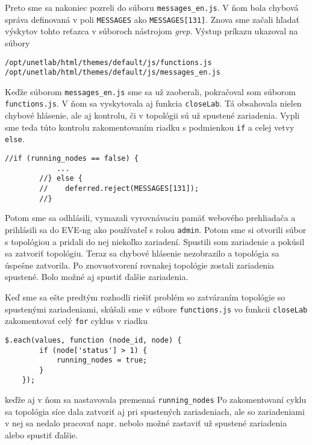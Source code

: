 Preto sme sa nakoniec pozreli do súboru \texttt{messages\_en.js}. V ňom bola chybová správa definovaná v poli \texttt{MESSAGES} ako \texttt{MESSAGES[131]}. Znova sme začali hľadať výskytov tohto reťazca v súboroch nástrojom \emph{grep}. Výstup príkazu ukazoval na súbory

\begin{Verbatim}[samepage=true]
/opt/unetlab/html/themes/default/js/functions.js
/opt/unetlab/html/themes/default/js/messages_en.js
\end{Verbatim}

Keďže súborom \texttt{messages\_en.js} sme sa už zaoberali, pokračoval som súborom \texttt{functions.js}. V ňom sa vyskytovala aj funkcia \texttt{closeLab}. Tá obsahovala nielen chybové hlásenie, ale aj kontrolu, či v topológii sú už spustené zariadenia. Vypli sme teda túto kontrolu zakomentovaním riadku s podmienkou \texttt{if} a celej vetvy \texttt{else}.

\begin{Verbatim}[samepage=true]
        //if (running_nodes == false) {
            ...
        //} else {
        //    deferred.reject(MESSAGES[131]);
        //}
\end{Verbatim}

Potom sme sa odhlásili, vymazali vyrovnávaciu pamäť webového prehliadača a prihlásili sa do EVE-ng ako používateľ s rolou \texttt{admin}. Potom sme si otvorili súbor s topológiou a pridali do nej niekoľko zariadení. Spustili som zariadenie a pokúsil sa zatvoriť topológiu. Teraz sa chybové hlásenie nezobrazilo a topológia sa úspešne zatvorila. Po znovuotvorení rovnakej topológie zostali zariadenia spustené. Bolo možné aj spustiť ďalšie zariadenia.

Keď sme sa ešte predtým rozhodli riešiť problém so zatváraním topológie so spustenými zariadeniami, skúšali sme v súbore \texttt{functions.js} vo funkcii \texttt{closeLab} zakomentovať celý \texttt{for} cyklus v riadku

\begin{Verbatim}[samepage=true]
    $.each(values, function (node_id, node) {
        if (node['status'] > 1) {
            running_nodes = true;
        }
    });
\end{Verbatim}
keďže aj v ňom sa nastavovala premenná \texttt{running\_nodes} Po zakomentovaní cyklu sa topológia síce dala zatvoriť aj pri spustených zariadeniach, ale so zariadeniami v nej sa nedalo pracovať napr. nebolo možné zastaviť už spustené zariadenia alebo spustiť ďalšie.

